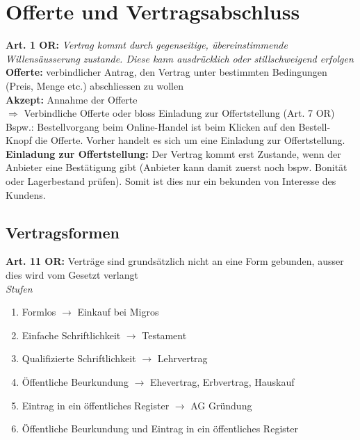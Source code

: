 \documentclass{report}
\theoremstyle{definition}
\theoremstyle{example}
\begin{document}
\section{Offerte und Vertragsabschluss}
\textbf{Art. 1 OR:} \textit{Vertrag kommt durch gegenseitige, übereinstimmende Willensäusserung zustande. Diese kann ausdrücklich oder stillschweigend erfolgen}\\
\textbf{Offerte:} verbindlicher Antrag, den Vertrag unter bestimmten Bedingungen (Preis, Menge etc.) abschliessen zu wollen\\
\textbf{Akzept:} Annahme der Offerte\\
$\Rightarrow$ Verbindliche Offerte oder bloss Einladung zur Offertstellung (Art. 7 OR)\\
Bspw.: Bestellvorgang beim Online-Handel ist beim Klicken auf den Bestell-Knopf die Offerte. Vorher handelt es sich um eine Einladung zur Offertstellung.\\
\textbf{Einladung zur Offertstellung:} Der Vertrag kommt erst Zustande, wenn der Anbieter eine Bestätigung gibt (Anbieter kann damit zuerst noch bspw. Bonität oder Lagerbestand prüfen). Somit ist dies nur ein bekunden von Interesse des Kundens.

\subsection{Vertragsformen}
\textbf{Art. 11 OR:} Verträge sind grundsätzlich nicht an eine Form gebunden, ausser dies wird vom Gesetzt verlangt\\
\textit{Stufen}
\begin{enumerate}
   \item Formlos $\rightarrow$ Einkauf bei Migros
   \item Einfache Schriftlichkeit $\rightarrow$ Testament
   \item Qualifizierte Schriftlichkeit $\rightarrow$ Lehrvertrag
   \item Öffentliche Beurkundung $\rightarrow$ Ehevertrag, Erbvertrag, Hauskauf
   \item Eintrag in ein öffentliches Register $\rightarrow$ AG Gründung
   \item Öffentliche Beurkundung und Eintrag in ein öffentliches Register
\end{enumerate}
\end{document}
